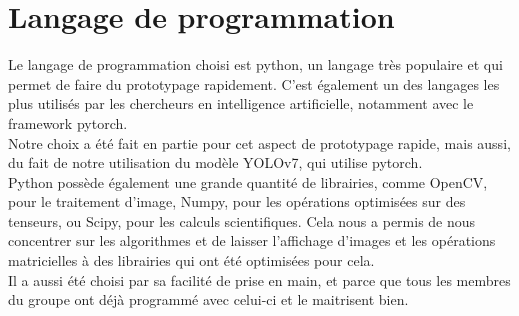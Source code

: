 \section{Langage de programmation}
Le langage de programmation choisi est python, un langage très populaire et qui permet de faire du prototypage rapidement. C'est également un des langages les plus utilisés par les chercheurs en intelligence artificielle, notamment avec le framework pytorch.\\
Notre choix a été fait en partie pour cet aspect de prototypage rapide, mais aussi, du fait de notre utilisation du modèle YOLOv7\cite{wang_yolov7_nodate}, qui utilise pytorch.\\
Python possède également une grande quantité de librairies, comme OpenCV, pour le traitement d'image, Numpy, pour les opérations optimisées sur des tenseurs, ou Scipy, pour les calculs scientifiques. Cela nous a permis de nous concentrer sur les algorithmes et de laisser l'affichage d'images et les opérations matricielles à des librairies qui ont été optimisées pour cela.\\
Il a aussi été choisi par sa facilité de prise en main, et parce que tous les membres du groupe ont déjà programmé avec celui-ci et le maitrisent bien.


\clearpage
